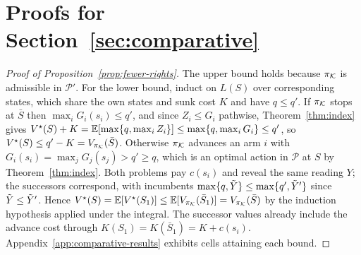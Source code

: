 \section{Proofs for Section~\ref{sec:comparative}}
\label{app:comparative}

\begin{proof}[Proof of Proposition~\ref{prop:fewer-rights}]
The upper bound holds because $\pi_{\mathcal{K}}$ is admissible in $\mathcal P'$. For
the lower bound, induct on $L(S)$ over corresponding states, which share
the own states and sunk cost $K$ and have $q\le q'$. If $\pi_{\mathcal{K}}$ stops at $\bar S$ then $\max_iG_i(s_i)\le q'$, and since $Z_i\le G_i$ pathwise,
Theorem~\ref{thm:index} gives
$V^\star(S)+K=\mathbb{E}[\max\{q,\max_iZ_i\}]\le\max\{q,\max_iG_i\}\le q'$, so
$V^\star(S)\le q'-K=V_{\pi_{\mathcal{K}}}(\bar S)$. Otherwise $\pi_{\mathcal{K}}$ advances an arm
$i$ with $G_i(s_i)=\max_jG_j(s_j)>q'\ge q$, which is an optimal action in
$\mathcal P$ at $S$ by Theorem~\ref{thm:index}. Both problems pay $c(s_i)$ and
reveal the same reading $Y$; the successors correspond, with incumbents
$\max\{q,\tilde Y\}\le\max\{q',\tilde Y'\}$ since $\tilde Y\le\tilde Y'$. Hence
$V^\star(S)=\mathbb{E}[V^\star(S_1)]\le\mathbb{E}[V_{\pi_{\mathcal{K}}}(\bar S_1)]
=V_{\pi_{\mathcal{K}}}(\bar S)$ by the induction hypothesis applied under the integral.
The successor values already include the advance cost through
$K(S_1)=K(\bar S_1)=K+c(s_i)$.
Appendix~\ref{app:comparative-results} exhibits cells attaining each bound.
\end{proof}

